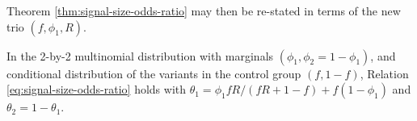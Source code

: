 Theorem \ref{thm:signal-size-odds-ratio} may then be re-stated in terms of the new trio $(f, \phi_1, R)$.


\begin{corollary} \label{cor:signal-size-odds-ratio-conditional-frequency}
In the 2-by-2 multinomial distribution with marginals $(\phi_1, \phi_2 = 1-\phi_1)$, and conditional distribution of the variants in the control group $(f, 1-f)$,
Relation \eqref{eq:signal-size-odds-ratio} holds with $\theta_1 = {\phi_1fR}/{(fR+1-f)} + f(1-\phi_1)$ and $\theta_2 = 1-\theta_1$.
\end{corollary} 

